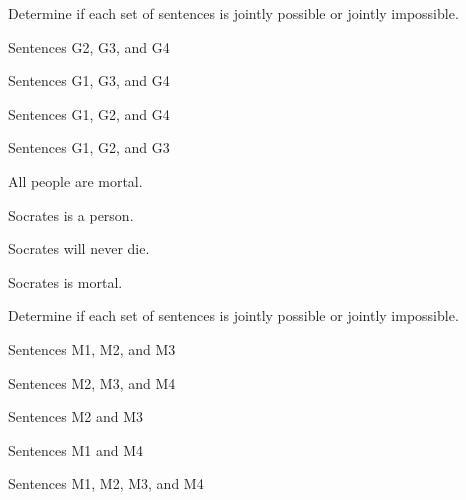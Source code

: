 \noindent Determine if each set of sentences is jointly possible or jointly impossible.
\begin{earg}
\item Sentences G2, G3, and G4
\item Sentences G1, G3, and G4
\item Sentences G1, G2, and G4
\item Sentences G1, G2, and G3
\end{earg}


\problempart 
\begin{earg}%
\item[M1.] \label{itm:allmortal} All people are mortal.
\item[M2.] \label{itm:socperson} Socrates is a person.
\item[M3.] \label{itm:socnotdie} Socrates will never die.
\item[M4.] \label{itm:socmortal} Socrates is mortal.
\end{earg}

\noindent Determine if each set of sentences is jointly possible or jointly impossible.
\begin{earg}
\item Sentences M1, M2, and M3
\item Sentences M2, M3, and M4
\item Sentences M2 and M3
\item Sentences M1 and M4
\item Sentences M1, M2, M3, and M4
\end{earg}


